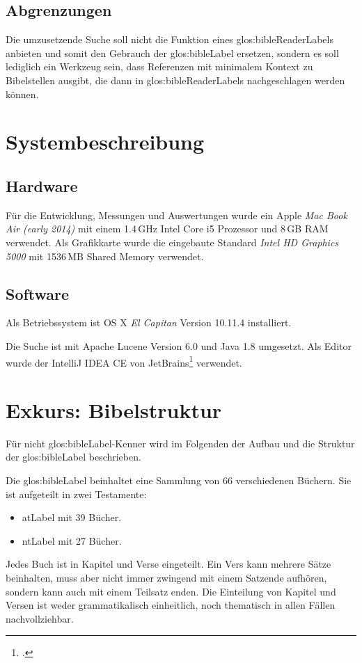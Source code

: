 \subsection{Abgrenzungen}
Die umzusetzende Suche soll nicht die Funktion eines \gls{glos:bibleReaderLabel}s anbieten und somit den Gebrauch der \gls{glos:bibleLabel} ersetzen, sondern es soll lediglich ein Werkzeug sein, dass Referenzen mit minimalem Kontext zu Bibelstellen ausgibt, die dann in \glspl{glos:bibleReaderLabel} nachgeschlagen werden können.

\section{Systembeschreibung}
\subsection{Hardware}
Für die Entwicklung, Messungen und Auswertungen wurde ein Apple \textit{Mac Book Air (early 2014)} mit einem 1.4\,GHz Intel Core i5 Prozessor und 8\,GB RAM verwendet. Als Grafikkarte wurde die eingebaute Standard \textit{Intel HD Graphics 5000} mit 1536\,MB Shared Memory verwendet.

\subsection{Software}
Als Betriebssystem ist OS X \textit{El Capitan} Version 10.11.4  installiert.

Die Suche ist mit Apache Lucene Version 6.0 und Java 1.8 umgesetzt. Als Editor wurde der IntelliJ IDEA CE von JetBrains\footcite{IntelliJ_IDEA_the_Java_IDE_2016-05-09} verwendet.

\section{Exkurs: Bibelstruktur}
Für nicht \gls{glos:bibleLabel}-Kenner wird im Folgenden der Aufbau und die Struktur der \gls{glos:bibleLabel} beschrieben.

Die \gls{glos:bibleLabel} beinhaltet eine Sammlung von 66 verschiedenen Büchern.
Sie ist aufgeteilt in zwei Testamente:
\begin{itemize}[noitemsep]
	\item \gls{atLabel} mit 39 Bücher.
	\item \gls{ntLabel} mit 27 Bücher.
\end{itemize}
Jedes Buch ist in Kapitel und Verse eingeteilt. Ein Vers kann mehrere Sätze beinhalten, muss aber nicht immer zwingend mit einem Satzende aufhören, sondern kann auch mit einem Teilsatz enden.
Die Einteilung von Kapitel und Versen ist weder grammatikalisch einheitlich, noch thematisch in allen Fällen nachvollziehbar.

